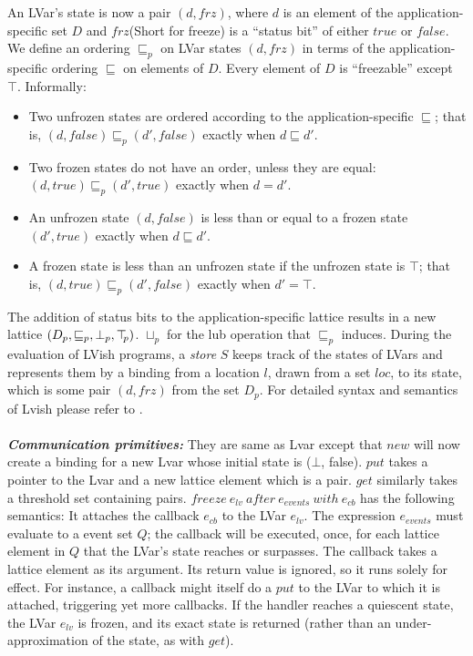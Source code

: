\documentclass[twocolumn]{article}
\newcommand{\userleq}{\ensuremath{\sqsubseteq}}
\newcommand{\lubp}[2]{\ensuremath{#1 \sqcup_p #2}}
\newcommand{\leqp}{\ensuremath{\sqsubseteq_p}}
\newcommand{\botp}{\ensuremath{\bot_{p}}}
\newcommand{\topp}{\ensuremath{\top\hspace{-0.85mm}_{p}}}
\newcommand{\state}[2]{\ensuremath{(#1, #2)}}
\newcommand{\status}{\ensuremath{\mathit{frz}}}
\begin{document}
An LVar’s state is now a pair $(d,frz )$, where $d$ is an element of the application-specific set $D$ and $frz$(Short for freeze) is a “status bit” of either $true$ or $false$. We define an ordering $\leqp$ on LVar states $\state{d}{\status}$ in terms of the application-specific ordering $\userleq$ on elements of $D$. Every element of $D$ is ``freezable'' except $\top$. Informally: 
\begin{itemize}
\item Two unfrozen states are ordered according to the application-specific $\userleq$; that is, $(d,false) \leqp (d',false)$
exactly when $d \userleq d'$.
\item Two frozen states do not have an order, unless they are equal: $(d,true) \leqp (d',true)$ exactly when $d = d'$.
\item An unfrozen state $(d,false)$ is less than or equal to a frozen state $(d',true)$ exactly when $d \userleq d'$.
\item A frozen state is less than an unfrozen state if the unfrozen state is $\top$; that is, $(d,true) \leqp (d',false)$ exactly when $d' = \top$.
\end{itemize}
The addition of status bits to the application-specific lattice results in a new lattice $(D_p, \leqp, \botp, \topp)$. $\lubp{}{}$ for the lub operation that $\leqp$ induces. During the evaluation of LVish programs, a \emph{store} $S$ keeps track of the states of LVars and represents them by a binding from a location $l$, drawn from a set $loc$, to its state, which is some pair $(d, frz)$ from the set $D_p$. For detailed syntax and semantics of Lvish please refer to \cite{lkuper2}.\\ \\
\textbf{\textit{Communication primitives:}} They are same as Lvar except that $new$ will now create a binding for a new Lvar whose initial state is ($\bot$, false). $put$ takes a pointer to the Lvar and a new lattice element which is a pair. $get$ similarly takes a threshold set containing pairs. $freeze\ e_{lv}\ after\ e_{events}\ with\ e_{cb}$ has the following semantics: It attaches the callback $e_{cb}$ to the LVar $e_{lv}$. The expression $e_{events}$ must evaluate to a event set $Q$; the callback will be executed, once, for each lattice element in $Q$ that the LVar’s state reaches or surpasses. The callback takes a lattice element as its argument. Its return value is ignored, so it runs solely for effect. For instance, a callback might itself do a $put$ to the LVar to which it is attached, triggering yet more callbacks. If the handler reaches a quiescent state, the LVar $e_{lv}$ is frozen, and its exact state is returned (rather than an under-approximation of the state, as with $get$).
\end{document}
